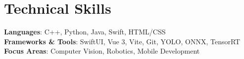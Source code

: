 \documentclass[letterpaper,11pt]{article}
\begin{document}
%
\section{Technical Skills}
 \begin{itemize}[leftmargin=0.15in, label={}]
    \small{\item{
     \textbf{Languages}{: C++, Python, Java, Swift, HTML/CSS} \\
     \textbf{Frameworks \& Tools}{: SwiftUI, Vue 3, Vite, Git, YOLO, ONNX, TensorRT} \\
     \textbf{Focus Areas}{: Computer Vision, Robotics, Mobile Development}
    }}
 \end{itemize}


\end{document}
